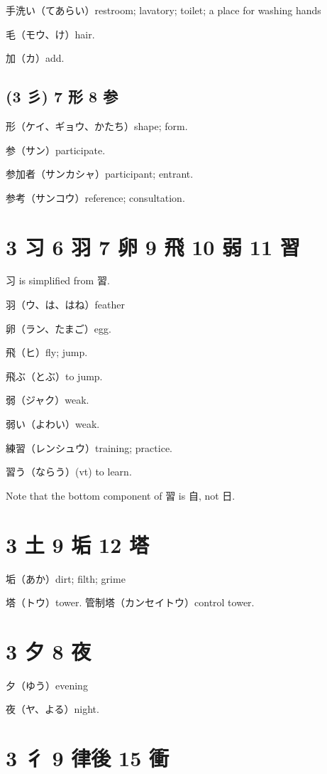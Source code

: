 手洗い（てあらい）restroom; lavatory; toilet; a place for washing hands

毛（モウ、け）hair.

加（カ）add.

\subsection{(3 彡) 7 形 8 参}

形（ケイ、ギョウ、かたち）shape; form.

参（サン）participate.

参加者（サンカシャ）participant; entrant.

参考（サンコウ）reference; consultation.

\section{3 习 6 羽 7 卵 9 飛 10 弱 11 習}

习 is simplified from 習.

羽（ウ、は、はね）feather

卵（ラン、たまご）egg.

飛（ヒ）fly; jump.

飛ぶ（とぶ）to jump.

弱（ジャク）weak.

弱い（よわい）weak.

練習（レンシュウ）training; practice.

習う（ならう）(vt) to learn.

Note that the bottom component of 習 is 自, not 日.

\section{3 土 9 垢 12 塔}

垢（あか）dirt; filth; grime

塔（トウ）tower.
管制塔（カンセイトウ）control tower.

\section{3 夕 8 夜}

夕（ゆう）evening

夜（ヤ、よる）night.

\section{3 彳 9 律後 15 衝}

